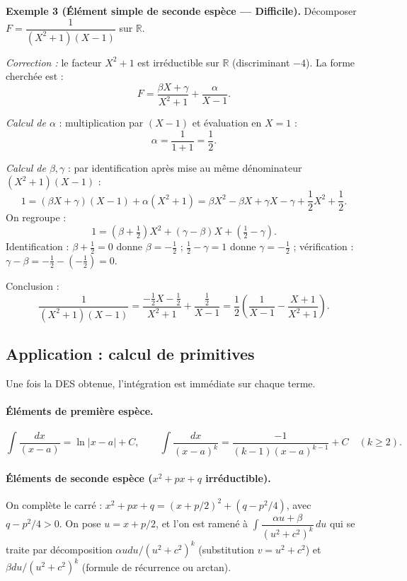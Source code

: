 \medskip

\textbf{Exemple 3 (Élément simple de seconde espèce --- Difficile).}
Décomposer $F = \dfrac{1}{(X^2 + 1)(X - 1)}$ sur $\mathbb{R}$.

\textit{Correction :} le facteur $X^2 + 1$ est irréductible sur $\mathbb{R}$ (discriminant $-4$). La forme cherchée est :
\[ F = \frac{\beta X + \gamma}{X^2 + 1} + \frac{\alpha}{X - 1}. \]

\emph{Calcul de $\alpha$} : multiplication par $(X - 1)$ et évaluation en $X = 1$ :
\[ \alpha = \frac{1}{1 + 1} = \frac{1}{2}. \]

\emph{Calcul de $\beta, \gamma$} : par identification après mise au même dénominateur $(X^2 + 1)(X - 1)$ :
\[ 1 = (\beta X + \gamma)(X - 1) + \alpha (X^2 + 1) = \beta X^2 - \beta X + \gamma X - \gamma + \frac{1}{2} X^2 + \frac{1}{2}. \]
On regroupe :
\[ 1 = \left( \beta + \tfrac{1}{2} \right) X^2 + (\gamma - \beta) X + \left( \tfrac{1}{2} - \gamma \right). \]
Identification :
$\beta + \tfrac{1}{2} = 0$ donne $\beta = -\tfrac{1}{2}$ ;
$\tfrac{1}{2} - \gamma = 1$ donne $\gamma = -\tfrac{1}{2}$ ;
vérification : $\gamma - \beta = -\tfrac{1}{2} - (-\tfrac{1}{2}) = 0$. \checkmark

\smallskip

Conclusion :
\[ \frac{1}{(X^2 + 1)(X - 1)} = \frac{-\tfrac{1}{2} X - \tfrac{1}{2}}{X^2 + 1} + \frac{\tfrac{1}{2}}{X - 1} = \frac{1}{2} \left( \frac{1}{X - 1} - \frac{X + 1}{X^2 + 1} \right). \]

\subsection{Application : calcul de primitives}

Une fois la DES obtenue, l'intégration est immédiate sur chaque terme.

\paragraph{Éléments de première espèce.}
\[ \int \frac{dx}{(x - a)} = \ln |x - a| + C, \qquad \int \frac{dx}{(x - a)^k} = \frac{-1}{(k - 1) (x - a)^{k - 1}} + C \quad (k \ge 2). \]

\paragraph{Éléments de seconde espèce ($x^2 + p x + q$ irréductible).}
On complète le carré : $x^2 + p x + q = (x + p/2)^2 + (q - p^2/4)$, avec $q - p^2/4 > 0$. On pose $u = x + p/2$, et l'on est ramené à $\int \dfrac{\alpha u + \beta}{(u^2 + c^2)^k}\, du$ qui se traite par décomposition $\alpha u du / (u^2 + c^2)^k$ (substitution $v = u^2 + c^2$) et $\beta du / (u^2 + c^2)^k$ (formule de récurrence ou arctan).

